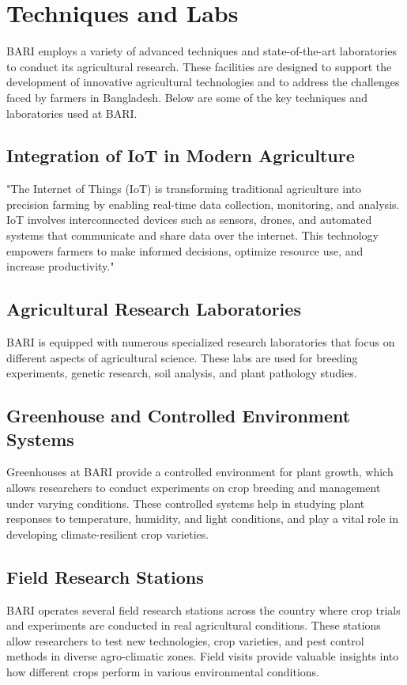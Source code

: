 \documentclass[oneside,12pt,fleqn]{book}
\begin{document}
\section{Techniques and Labs}
BARI employs a variety of advanced techniques and state-of-the-art laboratories to conduct its agricultural research. These facilities are designed to support the development of innovative agricultural technologies and to address the challenges faced by farmers in Bangladesh. Below are some of the key techniques and laboratories used at BARI.
\subsection{Integration of IoT in Modern Agriculture}
"The Internet of Things (IoT) is transforming traditional agriculture into precision farming by enabling real-time data collection, monitoring, and analysis. IoT involves interconnected devices such as sensors, drones, and automated systems that communicate and share data over the internet. This technology empowers farmers to make informed decisions, optimize resource use, and increase productivity."


\subsection{Agricultural Research Laboratories}
BARI is equipped with numerous specialized research laboratories that focus on different aspects of agricultural science. These labs are used for breeding experiments, genetic research, soil analysis, and plant pathology studies.
\subsection{Greenhouse and Controlled Environment Systems}
Greenhouses at BARI provide a controlled environment for plant growth, which allows researchers to conduct experiments on crop breeding and management under varying conditions. These controlled systems help in studying plant responses to temperature, humidity, and light conditions, and play a vital role in developing climate-resilient crop varieties.
\subsection{Field Research Stations}
BARI operates several field research stations across the country where crop trials and experiments are conducted in real agricultural conditions. These stations allow researchers to test new technologies, crop varieties, and pest control methods in diverse agro-climatic zones. Field visits provide valuable insights into how different crops perform in various environmental conditions.
\end{document}
